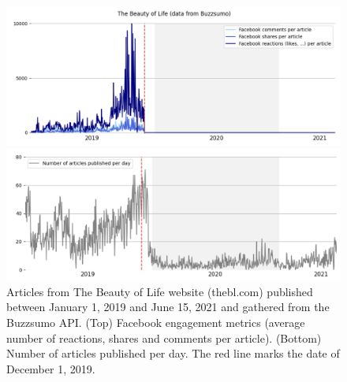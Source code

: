 \documentclass{article}
\begin{document}
\begin{figure}
	\centering
	
	\begin{multicols}{1}
		\includegraphics[scale=0.35]{./img/beautyoflife/fb_bl_1.png}
	\end{multicols}
	
	\begin{multicols}{1}
		\includegraphics[scale=0.35]{./img/beautyoflife/fb_bl_2.png} 
	\end{multicols}
	
	\caption{Articles from The Beauty of Life website (thebl.com) published between January 1, 2019 and June 15, 2021 and gathered from the Buzzsumo API. (Top) Facebook engagement metrics (average number of reactions, shares and comments per article). (Bottom) Number of articles published per day. The red line marks the date of December 1, 2019. }
	\label{fb_bl}
\end{figure}
\end{document}
